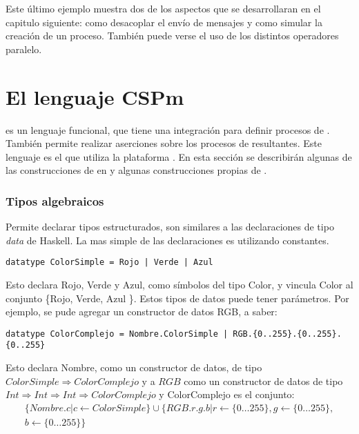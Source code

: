 Este último ejemplo muestra dos de los aspectos que se desarrollaran en el capitulo siguiente: como desacoplar el envío de mensajes y como simular la creación de un proceso. También puede verse el uso de los distintos operadores paralelo.
 
\section{El lenguaje CSPm}

\CSPm es un lenguaje funcional, que tiene una integración para definir procesos de \CSP. También permite realizar aserciones sobre los procesos de \CSP resultantes. Este lenguaje es el que utiliza la plataforma \FDR. En esta sección se describirán algunas de las construcciones de \CSP en \CSPm y algunas construcciones propias de \CSPm.

\subsubsection{Tipos algebraicos}

Permite declarar tipos estructurados, son similares a las declaraciones de tipo \textit{data} de Haskell. La mas simple de las declaraciones es utilizando constantes.

\begin{lstlisting}[language=cspm, style=sinnumeros]
datatype ColorSimple = Rojo | Verde | Azul
\end{lstlisting}

Esto declara Rojo, Verde y Azul, como símbolos del tipo Color, y vincula Color al conjunto \{Rojo, Verde, Azul \}. Estos tipos de datos puede tener parámetros. Por ejemplo, se pude agregar un constructor de datos RGB, a saber:

\begin{lstlisting}[language=cspm, style=sinnumeros]
datatype ColorComplejo = Nombre.ColorSimple | RGB.{0..255}.{0..255}.{0..255}
\end{lstlisting}

Esto declara Nombre, como un constructor de datos, de tipo $ColorSimple \Rightarrow ColorComplejo$ y a $RGB$ como un constructor de datos de  tipo $Int \Rightarrow Int \Rightarrow Int \Rightarrow ColorComplejo$ y ColorComplejo es el conjunto:
\begin{multline*}
\{ Nombre.c | c \leftarrow  ColorSimple \} \cup \{ RGB.r.g.b |  r \leftarrow \{ 0 \dots 255 \},  g \leftarrow \{ 0 \dots 255 \}, \\  b \leftarrow \{ 0 \dots 255 \} \}  
\end{multline*}

